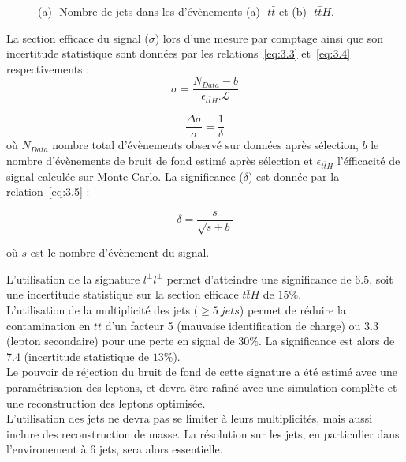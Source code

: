 \begin{figure}[H]
  \centering
  \quad
  \caption{(a)- Nombre de jets dans les d'\'ev\`enements (a)- $t\bar{t}$ et (b)- $t\bar{t}H$.}
  \label{fig:3.3}
\end{figure}

La section efficace du signal ($\sigma$) lors d'une mesure par comptage ainsi que son incertitude statistique sont donn\'ees par les relations~\eqref{eq:3.3} et~\eqref{eq:3.4} respectivements : 
\begin{equation}
  \label{eq:3.3}
  \sigma=\frac{N_{Data}-b}{\epsilon_{t\bar{t}H}.\mathcal{L}}
\end{equation}

\begin{equation}
  \label{eq:3.4}
 \frac{ \Delta \sigma}{\sigma}=\frac{1}{\delta}
\end{equation}
o\`u $N_{Data}$ nombre total d'\'ev\`enements observé sur données après sélection,  $b$ le nombre d'\'ev\`enements de bruit de fond estimé après sélection et $\epsilon_{t\bar{t}H}$ l'\'efficacit\'e de signal calcul\'ee sur Monte Carlo. La significance ($\delta$) est donn\'ee par la relation~\eqref{eq:3.5} : 

\begin{equation}
  \label{eq:3.5}
  \delta=\frac{s}{\sqrt{s+b}}
\end{equation}

o\`u $s$ est le nombre d'\'ev\`enement du signal.
~\par L'utilisation de la signature $l^{\pm}l^{\pm}$ permet d'atteindre une significance de $6.5$, soit une incertitude statistique sur la section efficace $t\bar{t}H$ de $15\%$.\\
L'utilisation de la multiplicité des jets ($\geq 5\ jets$) permet de réduire la contamination en $t\bar{t}$ d'un facteur 5 (mauvaise identification de charge) ou 3.3 (lepton secondaire) pour une perte en signal de $30\%$. La significance est alors de 7.4 (incertitude statistique de $13\%$).\\
Le pouvoir de réjection du bruit de fond de cette signature a été estimé avec une paramétrisation des leptons, et devra être rafiné avec une simulation complète et une reconstruction des leptons optimisée.\\
L'utilisation des jets ne devra pas se limiter à leurs multiplicités, mais aussi inclure des reconstruction de masse. La résolution sur les jets, en particulier dans l'environement à 6 jets, sera alors essentielle.  